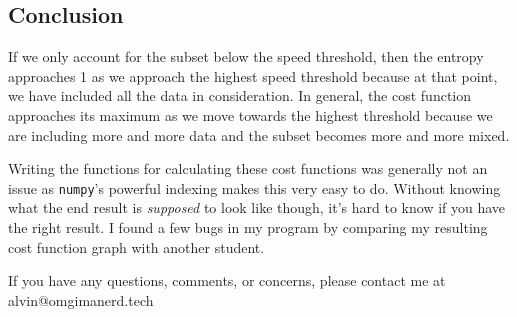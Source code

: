 \documentclass{math}
\begin{document}
\subsection*{Conclusion}
If we only account for the subset below the speed threshold, then the entropy
approaches 1 as we approach the highest speed threshold because at that point,
we have included all the data in consideration. In general, the cost function
approaches its maximum as we move towards the highest threshold because we are
including more and more data and the subset becomes more and more mixed. \par
Writing the functions for calculating these cost functions was generally not an
issue as \texttt{numpy}'s powerful indexing makes this very easy to do.
Without knowing what the end result is \textit{supposed} to look like though,
it's hard to know if you have the right result. I found a few bugs in my program
by comparing my resulting cost function graph with another student.

\begin{center}
  If you have any questions, comments, or concerns, please contact me at
  alvin@omgimanerd.tech
\end{center}
\end{document}
